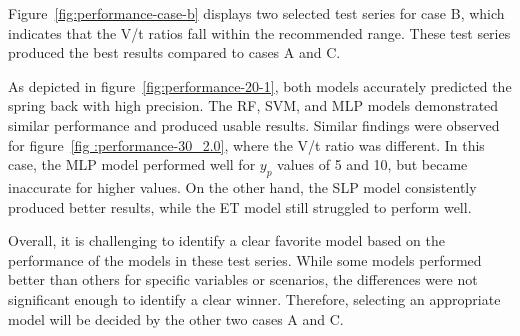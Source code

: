 Figure~\ref{fig:performance-case-b} displays two selected test series for case B, which indicates
that the V/t ratios fall within the recommended range. These test series produced the best
results compared to cases A and C.

As depicted in figure~\ref{fig:performance-20-1}, both models accurately predicted the spring
back with high precision. The \ac{RF}, \ac{SVM}, and \ac{MLP} models demonstrated similar
performance and produced usable results. Similar findings were observed for figure~\ref{fig
:performance-30_2.0}, where the V/t ratio was different. In this case, the \ac{MLP} model
performed well for \(y_p\) values of 5 and 10, but became inaccurate for higher values. On the
other hand, the \ac{SLP} model consistently produced better results, while the \ac{ET} model
still struggled to perform well.

Overall, it is challenging to identify a clear favorite model based on the performance of the
models in these test series.
While some models performed better than others for specific variables or scenarios, the
differences were not significant enough to identify a clear winner.
Therefore, selecting an appropriate model will be decided by the other two cases A and C.


